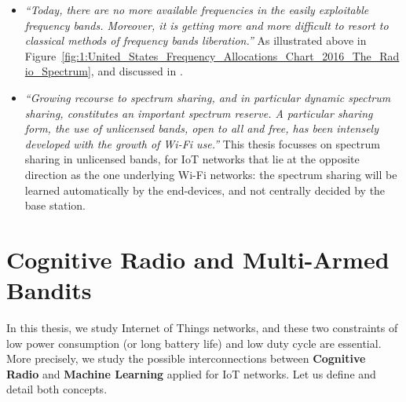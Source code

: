\begin{itemize}
    \item
    \emph{``Today, there are no more available frequencies in the easily exploitable frequency bands.
    Moreover, it is getting more and more difficult to resort to classical methods of frequency bands liberation.''}
    As illustrated above in Figure~\ref{fig:1:United_States_Frequency_Allocations_Chart_2016_The_Radio_Spectrum}, and discussed in \cite{patil2011survey,valenta2010survey}.
    \item
    \emph{``Growing recourse to spectrum sharing, and in particular dynamic spectrum sharing, constitutes an important spectrum reserve.
    A particular sharing form, the use of unlicensed bands, open to all and free, has been intensely developed with the growth of Wi-Fi use.''}
    This thesis focusses on spectrum sharing in unlicensed bands, for IoT networks that lie at the opposite direction as the one underlying Wi-Fi networks: the spectrum sharing will be learned automatically by the end-devices, and not centrally decided by the base station.
\end{itemize}


\section{Cognitive Radio and Multi-Armed Bandits}

In this thesis, we study Internet of Things networks, and these two constraints of low power consumption (or long battery life) and low duty cycle are essential.
More precisely, we study the possible interconnections between \textbf{Cognitive Radio} and \textbf{Machine Learning} applied for IoT networks.
Let us define and detail both concepts.





